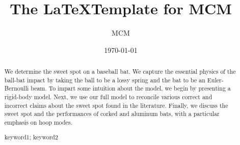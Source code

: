 \documentclass[a4paper,11pt]{article}
\title{The \LaTeX Template for MCM}
\author{\small MCM }
\date{\today}
\begin{document}
\begin{abstract}
  We determine the sweet spot on a baseball bat. We capture the essential
  physics of the ball-bat impact by taking the ball to be a lossy spring and
  the bat to be an Euler-Bernoulli beam. To impart some intuition about the
  model, we begin by presenting a rigid-body model. Next, we use our full model
  to reconcile various correct and incorrect claims about the sweet spot found
  in the literature. Finally, we discuss the sweet spot and the performances of
  corked and aluminum bats, with a particular emphasis on hoop modes.
    \begin{keywords}
        keyword1; keyword2
    \end{keywords}
\end{abstract}

\maketitle
\thispagestyle{empty}
\pagestyle{empty}
\newpage

\tableofcontents
\newpage
\pagestyle{fancy}
\setcounter{page}{1}


\end{document}
